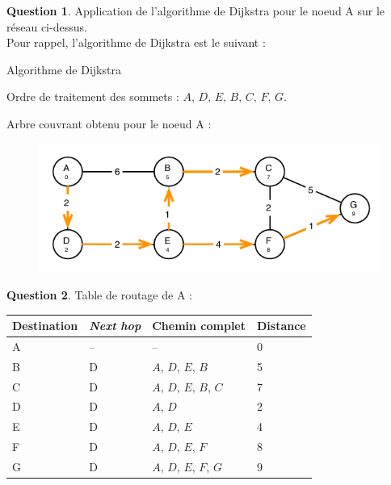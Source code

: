 \documentclass[11pt,english,french]{scrreprt}
\theoremstyle{remark}
\theoremstyle{definition}
\newtheorem{ques}{Question}[section]
\begin{document}
\begin{ques}
	Application de l'algorithme de Dijkstra pour le noeud A sur le réseau ci-dessus.\\
	Pour rappel, l'algorithme de Dijkstra est le suivant :\\
	\begin{algorithm}[H]
		\DontPrintSemicolon
		\caption{Algorithme de Dijkstra}
	\end{algorithm}
	
	Ordre de traitement des sommets : $A,\,D,\,E,\,B,\,C,\,F,\,G$.
	
	Arbre couvrant obtenu pour le noeud A : 
	\begin{figure}[h]
		\center
		\includegraphics[scale=1]{Exam2009/graphe2}
	\end{figure}
\end{ques}

\begin{ques}
	Table de routage de A :\\
	\begin{tabularx}{\textwidth}{XXXX}
		\toprule 
		Destination & \emph{Next hop} & Chemin complet & Distance\tabularnewline
		\midrule
		\midrule 
		A & -- & -- & 0\tabularnewline
		\midrule 
		B & D & $A,\,D,\,E,\,B$  & 5\tabularnewline
		\midrule 
		C & D & $A,\,D,\,E,\,B,\,C$ & 7\tabularnewline
		\midrule 
		D & D & $A,\,D$ & 2\tabularnewline
		\midrule 
		E & D & $A,\,D,\,E$ & 4 \tabularnewline
		\midrule 
		F & D & $A,\,D,\,E,\,F$ & 8\tabularnewline
		\midrule 
		G & D & $A,\,D,\,E,\,F,\,G$ & 9 \tabularnewline
		\bottomrule
	\end{tabularx}
\end{ques}
\end{document}
